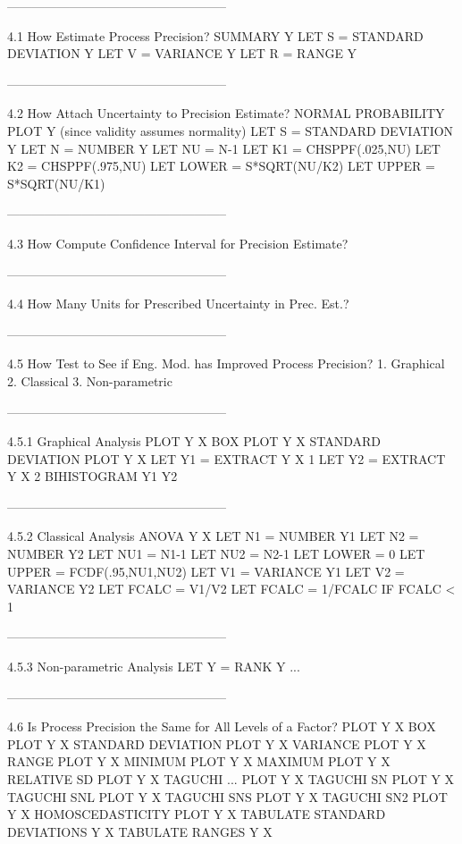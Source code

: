-----------------------------------------------------
 
4.1
How Estimate Process Precision?
      SUMMARY Y
      LET S = STANDARD DEVIATION Y
      LET V = VARIANCE Y
      LET R = RANGE Y
 
-----------------------------------------------------
 
4.2
How Attach Uncertainty to Precision Estimate?
      NORMAL PROBABILITY PLOT Y (since validity assumes normality)
      LET S = STANDARD DEVIATION Y
      LET N = NUMBER Y
      LET NU = N-1
      LET K1 = CHSPPF(.025,NU)
      LET K2 = CHSPPF(.975,NU)
      LET LOWER = S*SQRT(NU/K2)
      LET UPPER = S*SQRT(NU/K1)
 
-----------------------------------------------------
 
4.3
How Compute Confidence Interval for Precision Estimate?
 
-----------------------------------------------------
 
4.4
How Many Units for Prescribed Uncertainty in Prec. Est.?
 
-----------------------------------------------------
 
4.5
How Test to See if Eng. Mod. has Improved Process Precision?
   1. Graphical
   2. Classical
   3. Non-parametric
 
-----------------------------------------------------
 
4.5.1
Graphical Analysis
      PLOT Y X
      BOX PLOT Y X
      STANDARD DEVIATION PLOT Y X
      LET Y1 = EXTRACT Y X 1
      LET Y2 = EXTRACT Y X 2
      BIHISTOGRAM Y1 Y2
 
-----------------------------------------------------
 
4.5.2
Classical Analysis
      ANOVA Y X
      LET N1 = NUMBER Y1
      LET N2 = NUMBER Y2
      LET NU1 = N1-1
      LET NU2 = N2-1
      LET LOWER = 0
      LET UPPER = FCDF(.95,NU1,NU2)
      LET V1 = VARIANCE Y1
      LET V2 = VARIANCE Y2
      LET FCALC = V1/V2
      LET FCALC = 1/FCALC IF FCALC < 1
 
-----------------------------------------------------
 
4.5.3
Non-parametric Analysis
      LET Y = RANK Y
      ...
 
-----------------------------------------------------
 
4.6
Is Process Precision the Same for All Levels of a Factor?
      PLOT Y X
      BOX PLOT Y X
      STANDARD DEVIATION PLOT Y X
      VARIANCE PLOT Y X
      RANGE PLOT Y X
      MINIMUM PLOT Y X
      MAXIMUM PLOT Y X
      RELATIVE SD PLOT Y X
      TAGUCHI ... PLOT Y X
         TAGUCHI SN PLOT Y X
         TAGUCHI SNL PLOT Y X
         TAGUCHI SNS PLOT Y X
         TAGUCHI SN2 PLOT Y X
      HOMOSCEDASTICITY PLOT Y X
      TABULATE STANDARD DEVIATIONS Y X
      TABULATE RANGES Y X
 

